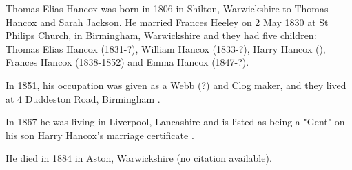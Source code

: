 
Thomas Elias Hancox was born in 1806 in Shilton, Warwickshire \cite{TEHancoxBirth} to Thomas Hancox and Sarah Jackson.
He married Frances Heeley on 2  May 1830 	at St Philips Church, in Birmingham, Warwickshire and they had five children: Thomas Elias Hancox (1831-?), William Hancox (1833-?), Harry Hancox (), Frances Hancox (1838-1852) and Emma Hancox (1847-?).

In 1851, his occupation was given as a Webb (?) and Clog maker, and they lived at 4 Duddeston Road, Birmingham \cite{TEHancoxOccupation}.

In 1867 he was living in Liverpool, Lancashire and is listed as being a "Gent" on his son Harry Hancox's marriage certificate \cite{TEHancox1867}.

He died in 1884 in Aston, Warwickshire (no citation available).
